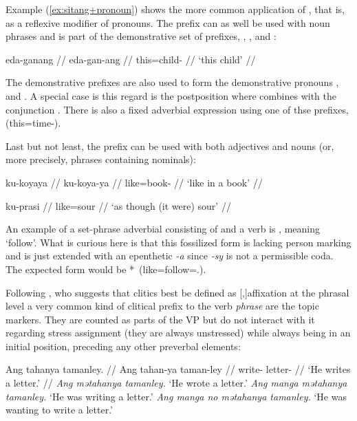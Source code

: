 Example (\ref{ex:sitang+pronoun}) shows the more common application of 
, that is, as a reflexive modifier of pronouns. The 
prefix  can as well be used with noun phrases and is part of the 
demonstrative set of prefixes, , , and 
:

\ex\begingl
	\gla eda-ganang //
	\glb eda-gan-ang //
	\glc this=child-\Aarg{} //
	\glft `this child' //
\endgl\xe

The demonstrative prefixes are also used to form the demonstrative 
pronouns , 
 and . A special case 
is this regard is the postposition  where  combines with the conjunction 
. There is also a fixed adverbial 
expression using one of thse prefixes,  (this=time-\Dat{}).

Last but not least, the prefix  can be used 
with both adjectives and nouns (or, more precisely, phrases containing 
nominals):

\pex
\a\begingl
	\gla ku-koyaya //
	\glb ku-koya-ya //
	\glc like=book-\Loc{} //
	\glft `like in a book' //
\endgl

\a\begingl
	\gla ku-prasi //
	\glb like=sour //
	\glft `as though (it were) sour' //
\endgl
\xe

An example of a set-phrase adverbial consisting of  and a verb 
is ,  meaning `follow'. 
What is curious here is that this fossilized form is lacking person marking 
and is just extended with an epenthetic \textit{-a} since \textit{-sy} is not 
a permissible coda. The expected form would be 
*\, (like=follow=\TsgI{}.\Aarg{}).

Following \citet{klavans1985}, who suggests that clitics best be defined as 
[,]{affixation at the phrasal level} a very common 
kind of clitical prefix to the verb \emph{phrase} are the topic markers. They 
are counted as parts of the VP but do not interact with it regarding stress 
assignment (they are always unstressed) while always being in an initial 
position, preceding any other preverbal elements:

\pex
	\a\begingl
		\gla Ang tahanya tamanley. //
		\glb Ang tahan-ya taman-ley //
		\glc \AgtT{} write-\TsgM{} letter-\PargI{} //
		\glft `He writes a letter.' //
	\endgl
	\a \textit{Ang mətahanya tamanley.} `He wrote a letter.'
	\a \textit{Ang manga mətahanya tamanley.} `He was writing a letter.'
	\a \textit{Ang manga no mətahanya tamanley.} `He was wanting to write a 
		letter.'
\xe

